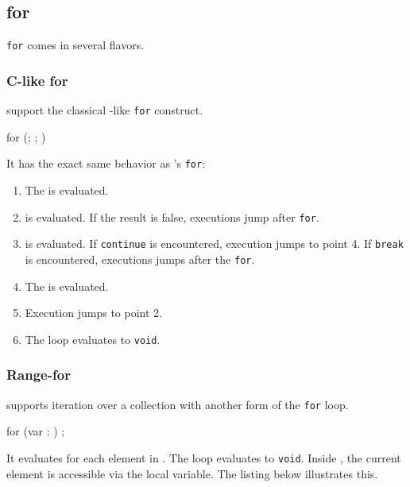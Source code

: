 \subsection{for}
\label{sec:lang:for}
\lstinline|for| comes in several flavors.

\subsubsection{C-like for}

\us support the classical \C-like \lstinline|for| construct.

\begin{urbiunchecked}[frame=, backgroundcolor=, ]
for (; ; )
\end{urbiunchecked}

It has the exact same behavior as \C's \lstinline|for|:

\begin{enumerate}
\item The  is evaluated.
\item {} is evaluated. If the result is false, executions
  jump after \lstinline|for|.
\item {} is evaluated. If \lstinline|continue| is encountered,
  execution jumps to point 4. If \lstinline|break| is encountered,
  executions jumps after the \lstinline|for|.
\item The  is evaluated.
\item Execution jumps to point 2.
\item The loop evaluates to \lstinline|void|.
\end{enumerate}

\subsubsection{Range-for}
\label{sec:lang:for:each}

\us supports iteration over a collection with another form of the
\lstinline|for| loop.

\begin{urbiunchecked}[frame=, backgroundcolor=, ]
for (var  : )
   ;
\end{urbiunchecked}

It evaluates  for each element in . The loop
evaluates to \lstinline|void|.  Inside , the current element
is accessible via the  local variable. The listing below
illustrates this.

